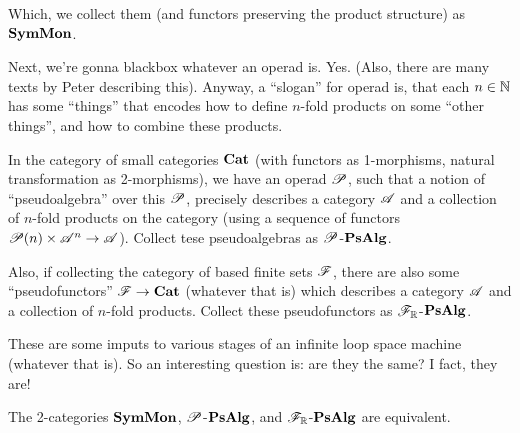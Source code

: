 \documentclass{article}
\begin{document}
Which, we collect them (and functors preserving the product structure) as $\mathbf{SymMon}$.

Next, we're gonna blackbox whatever an operad is. Yes. (Also, there are many texts by Peter describing this). Anyway, a ``slogan'' for operad is, that each $n\in\mathbb{N}$ has some ``things'' that encodes how to define $n$-fold products on some ``other things'', and how to combine these products.

In the category of small categories $\mathbf{Cat}$ (with functors as 1-morphisms, natural transformation as 2-morphisms), we have an operad $\mathscr{P}$, such that a notion of ``pseudoalgebra'' over this $\mathscr{P}$, precisely describes a category $\mathscr{A}$ and a collection of $n$-fold products on the category (using a sequence of functors $\mathscr{P}(n)\times \mathscr{A}^n\rightarrow\mathscr{A}$). Collect tese pseudoalgebras as $\mathscr{P}$-$\mathbf{PsAlg}$.

Also, if collecting the category of based finite sets $\mathscr{F}$, there are also some ``pseudofunctors'' $\mathscr{F}\rightarrow\mathbf{Cat}$ (whatever that is) which describes a category $\mathscr{A}$ and a collection of $n$-fold products. Collect these pseudofunctors as $\mathscr{F}_{\mathbb{R}}$-$\mathbf{PsAlg}$. 

These are some imputs to various stages of an infinite loop space machine (whatever that is). So an interesting question is: are they the same? I fact, they are!

\begin{thm}
    The 2-categories $\mathbf{SymMon}$, $\mathscr{P}$-$\mathbf{PsAlg}$, and $\mathscr{F}_{\mathbb{R}}$-$\mathbf{PsAlg}$ are equivalent.
\end{thm}
\end{document}
